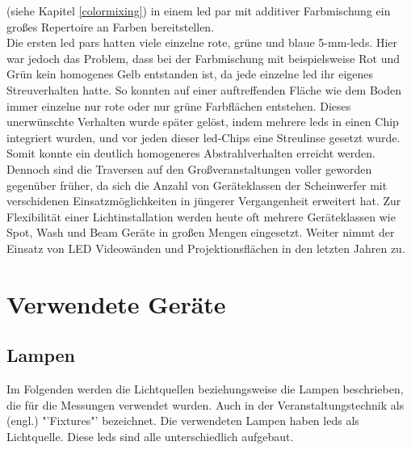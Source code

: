 \documentclass[11pt]{scrartcl}
\begin{document}
(siehe Kapitel \ref{colormixing}) in einem \ac{led} \ac{par} mit additiver Farbmischung ein großes Repertoire an Farben bereitstellen.\\
Die ersten \ac{led} \ac{par}s hatten viele einzelne rote, grüne und blaue 5-mm-\ac{led}s. Hier war jedoch das Problem, dass bei der
Farbmischung mit beispielsweise Rot und Grün kein homogenes Gelb entstanden ist, da jede einzelne \ac{led} ihr eigenes Streuverhalten
hatte. So konnten auf einer auftreffenden Fläche wie dem Boden immer einzelne nur rote oder nur grüne Farbflächen entstehen. Dieses
unerwünschte Verhalten wurde später gelöst, indem mehrere \ac{led}s in einen Chip integriert wurden, und vor jeden dieser \ac{led}-Chips
eine Streulinse gesetzt wurde. Somit konnte ein deutlich homogeneres Abstrahlverhalten erreicht werden.\\
Dennoch sind die Traversen auf den Großveranstaltungen voller geworden gegenüber früher, da sich die Anzahl von Geräteklassen der
Scheinwerfer mit verschidenen Einsatzmöglichkeiten in jüngerer Vergangenheit erweitert hat. Zur Flexibilität einer Lichtinstallation werden
heute oft mehrere Geräteklassen wie Spot, Wash und Beam Geräte in großen Mengen eingesetzt. Weiter nimmt der Einsatz von LED Videowänden
und Projektionsflächen in den letzten Jahren zu.
\clearpage

\section{Verwendete Geräte}
\subsection{Lampen}\label{lamps}
Im Folgenden werden die Lichtquellen beziehungsweise die Lampen beschrieben, die für die Messungen verwendet wurden.
Auch in der Veranstaltungstechnik als (engl.) "'Fixtures"' bezeichnet. Die verwendeten Lampen haben \ac{led}s als Lichtquelle. Diese
\ac{led}s sind alle unterschiedlich aufgebaut.
\end{document}
